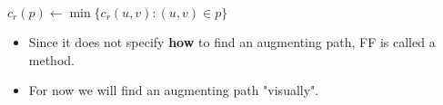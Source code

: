 \documentclass{beamer}
\newcommand{\set}[1]{\ensuremath{\{#1\}}}
\begin{document}
\begin{frame}[fragile]
  \frametitle{}

  \begin{algorithm}[H]
    \DontPrintSemicolon
    \KwFn \;

    {
      $c_r(p)\gets \min\set{c_r(u,v): (u,v)\in p} $\;


    }
    \end{algorithm}
\begin{itemize}
  \item Since it does not specify \textbf{how} to find an augmenting path, FF is called a method. 
  \item For now we will find an augmenting path "visually".
\end{itemize}
\end{frame}
\setcounter{subfigure}{0}
\end{document}
